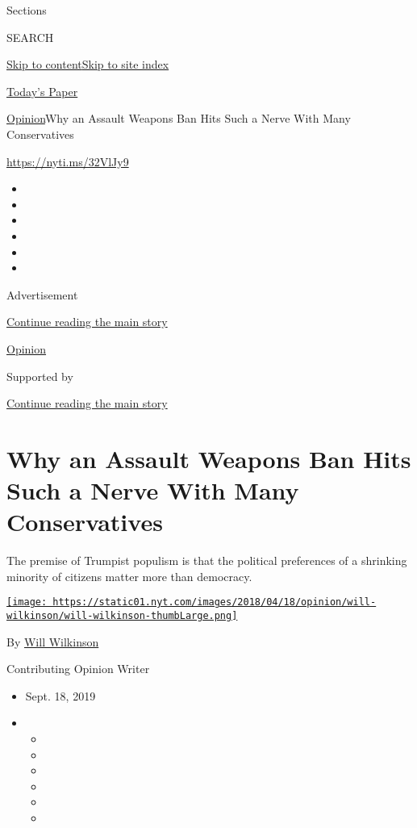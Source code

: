 Sections

SEARCH

\protect\hyperlink{site-content}{Skip to
content}\protect\hyperlink{site-index}{Skip to site index}

\href{https://myaccount.nytimes.com/auth/login?response_type=cookie\&client_id=vi}{}

\href{https://www.nytimes.com/section/todayspaper}{Today's Paper}

\href{/section/opinion}{Opinion}\textbar{}Why an Assault Weapons Ban
Hits Such a Nerve With Many Conservatives

\href{https://nyti.ms/32VlJy9}{https://nyti.ms/32VlJy9}

\begin{itemize}
\item
\item
\item
\item
\item
\item
\end{itemize}

Advertisement

\protect\hyperlink{after-top}{Continue reading the main story}

\href{/section/opinion}{Opinion}

Supported by

\protect\hyperlink{after-sponsor}{Continue reading the main story}

\hypertarget{why-an-assault-weapons-ban-hits-such-a-nerve-with-many-conservatives-}{%
\section{Why an Assault Weapons Ban Hits Such a Nerve With Many
Conservatives
}\label{why-an-assault-weapons-ban-hits-such-a-nerve-with-many-conservatives-}}

The premise of Trumpist populism is that the political preferences of a
shrinking minority of citizens matter more than democracy.

\href{https://www.nytimes.com/column/will-wilkinson}{\texttt{[image: https://static01.nyt.com/images/2018/04/18/opinion/will-wilkinson/will-wilkinson-thumbLarge.png]}}

By \href{https://www.nytimes.com/column/will-wilkinson}{Will Wilkinson}

Contributing Opinion Writer

\begin{itemize}
\item
  Sept. 18, 2019
\item
  \begin{itemize}
  \item
  \item
  \item
  \item
  \item
  \item
  \end{itemize}
\end{itemize}

